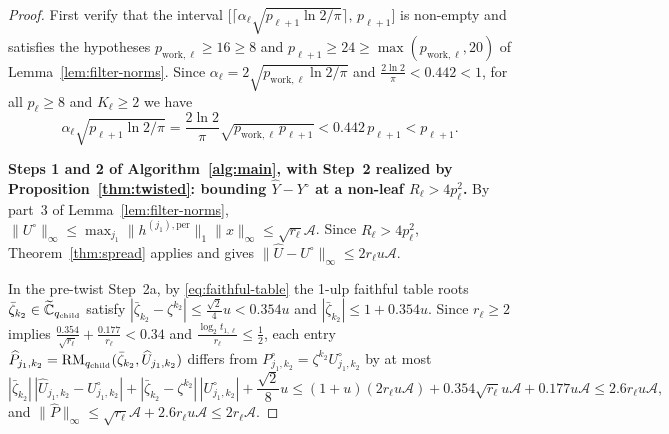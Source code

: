 \begin{proof}
First verify that the interval $\bigl[\lceil \alpha_\ell\sqrt{p_{\ell+1}\ln 2 / \pi} \rceil, \, p_{\ell+1}\bigr]$ is non-empty and satisfies the hypotheses $p_{\mathrm{work},\ell} \ge 16 \ge 8$ and $p_{\ell+1} \ge 24 \ge \max(p_{\mathrm{work},\ell}, 20)$ of Lemma~\ref{lem:filter-norms}. Since $\alpha_\ell = 2\sqrt{p_{\mathrm{work},\ell}\ln 2 / \pi}$ and $\frac{2\ln 2}{\pi} < 0.442 < 1$, for all $p_\ell \ge 8$ and $K_\ell \ge 2$ we have
\[
  \alpha_\ell\sqrt{p_{\ell+1}\ln 2 / \pi} = \frac{2\ln 2}{\pi}\sqrt{p_{\mathrm{work},\ell}\,p_{\ell+1}} < 0.442\,p_{\ell+1} < p_{\ell+1}.
\]

\textbf{Steps 1 and 2 of Algorithm~\ref{alg:main}, with Step~2 realized by Proposition~\ref{thm:twisted}: bounding $\widehat{Y} - Y^\circ$ at a non-leaf $R_\ell > 4 p_\ell^2$.}
By part~3 of Lemma~\ref{lem:filter-norms}, $\|U^\circ\|_\infty \le \max_{j_1} \|h^{(j_1),\mathrm{per}}\|_1 \|x\|_\infty \le \sqrt{r_\ell}\mathcal{A}$. Since $R_\ell > 4 p_\ell^2$, Theorem~\ref{thm:spread} applies and gives $\|\widehat{U} - U^\circ\|_\infty \le 2 r_\ell u \mathcal{A}$.

In the pre-twist Step~2a, by \eqref{eq:faithful-table} the 1-ulp faithful table roots $\bar{\zeta}_{k_2} \in \widetilde{\mathbb{C}}_{q_{\mathrm{child}}}$ satisfy $|\bar{\zeta}_{k_2} - \zeta^{k_2}| \le \frac{\sqrt{2}}{4} u < 0.354 u$ and $|\bar{\zeta}_{k_2}| \le 1 + 0.354 u$. Since $r_\ell \ge 2$ implies $\frac{0.354}{\sqrt{r_\ell}} + \frac{0.177}{r_\ell} < 0.34$ and $\frac{\log_2 t_{1,\ell}}{r_\ell} \le \frac{1}{2}$, each entry $\widehat{P}_{j_1, k_2} = \operatorname{RM}_{q_{\mathrm{child}}}(\bar{\zeta}_{k_2}, \widehat{U}_{j_1, k_2})$ differs from $P^\circ_{j_1, k_2} = \zeta^{k_2} U^\circ_{j_1, k_2}$ by at most
\[
  |\bar{\zeta}_{k_2}| \, |\widehat{U}_{j_1, k_2} - U^\circ_{j_1, k_2}| + |\bar{\zeta}_{k_2} - \zeta^{k_2}| \, |U^\circ_{j_1, k_2}| + \frac{\sqrt{2}}{8} u \le (1 + u)(2 r_\ell u \mathcal{A}) + 0.354 \sqrt{r_\ell} u \mathcal{A} + 0.177 u \mathcal{A} \le 2.6 r_\ell u \mathcal{A},
\]
and $\|\widehat{P}\|_\infty \le \sqrt{r_\ell}\mathcal{A} + 2.6 r_\ell u \mathcal{A} \le 2 r_\ell \mathcal{A}$.


\end{proof}
